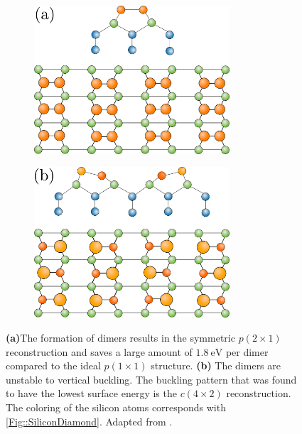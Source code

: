 	\begin{figure}[htb]
		\begin{subfigure}{0.5\textwidth}
			\centering
			\includegraphics[width=0.8\textwidth]{graphics/p(2x1)-sym-color.png}
			\label{p(2x1)-symmetric}
		\end{subfigure}
		\begin{subfigure}{0.5\textwidth}
			\centering
			\includegraphics[width=0.8\textwidth]{graphics/c(4x2)-color.png}
			\label{c(4x2)}
		\end{subfigure}
		\caption{ \textbf{(a)}The formation of dimers results in the symmetric $p(2\times1)$ reconstruction and saves a large amount of $1.8~\text{eV}$ per dimer compared to the ideal $p(1\times1)$ structure. \textbf{(b)} The dimers are unstable to vertical buckling. The buckling pattern that was found to have the lowest surface energy is the $c(4\times2)$ reconstruction. The coloring of the silicon atoms corresponds with \autoref{Fig::SiliconDiamond}. Adapted from \cite{brand2023critical}.}
		\label{Fig::dimer-configs}
	\end{figure}
